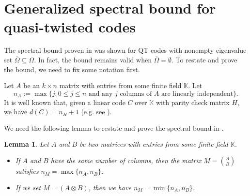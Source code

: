 \documentclass[11pt]{amsart}
\theoremstyle{plain}
\newtheorem{lem}[thm]{Lemma}
\theoremstyle{definition}
\numberwithin{equation}{section}
\newcommand{\K}{\mathbb{K}}
\begin{document}
\section{Generalized spectral bound for quasi-twisted codes}\label{bound sect}

The spectral bound proven in \cite[Theorem 13]{ELLOT} was shown for QT codes with nonempty eigenvalue set $\overline{\Omega}\subseteq\Omega$. In fact, the bound remains valid when $\overline{\Omega}=\emptyset$. To restate and prove the bound, we need to fix some notation first.

Let $A$ be an $k\times n$ matrix with entries from some finite field $\K$. Let 
\begin{equation}\label{nA}
n_A:=\max\{j : 0\leq j \leq n \mbox{\ and\ any\ } j \mbox{\ columns\ of\ } A \mbox{\ are\ linearly\ independent}  \}.
\end{equation}
It is well known that, given a linear code $C$ over $\K$ with parity check matrix $H$, we have $d(C)=n_H+1$ (e.g. see \cite[Corollary 4.5.7 ]{LX}). 

We need the following lemma to restate and prove the spectral bound in \cite{ELLOT}.
\begin{lem}\label{bound lemma}
Let $A$ and $B$ be two matrices with entries from some finite field $\K$.
\begin{itemize}
\item[i.] If $A$ and $B$ have the same number of columns, then the matrix $M={A\choose B}$ satisfies $n_M=\max\{n_A,n_B\}$.
\item[ii.] If we set $M=(A\otimes B)$, then we have $n_M=\min\{n_A,n_B\}$.
\end{itemize}
\end{lem}
\end{document}

